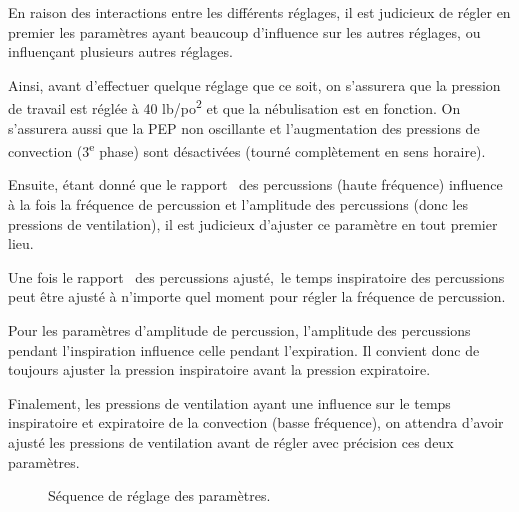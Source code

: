 En raison des interactions entre les différents réglages, il est
judicieux de régler en premier les paramètres ayant beaucoup
d'influence sur les autres réglages, ou influençant plusieurs autres
réglages.

Ainsi, avant d'effectuer quelque réglage que ce soit, on s'assurera
que la pression de travail est réglée à 40 lb/po\textsuperscript{2} et
que la nébulisation est en fonction. On s'assurera aussi que la PEP
non oscillante et l'augmentation des pressions de convection
(3\textsuperscript{e} phase) sont désactivées (tourné complètement en
sens horaire).

Ensuite, étant donné que le rapport \ie\ des percussions (haute
fréquence) influence à la fois la fréquence de percussion et
l'amplitude des percussions (donc les pressions de ventilation), il
est judicieux d'ajuster ce paramètre en tout premier lieu.

Une fois le rapport \ie\ des percussions ajusté,~le temps inspiratoire
des percussions peut être ajusté à n'importe quel moment pour régler
la fréquence de percussion.

Pour les paramètres d'amplitude de percussion, l'amplitude des
percussions pendant l'inspiration influence celle pendant
l'expiration.  Il convient donc de toujours ajuster la pression
inspiratoire avant la pression expiratoire.

Finalement, les pressions de ventilation ayant une influence sur le
temps inspiratoire et expiratoire de la convection (basse fréquence),
on attendra d'avoir ajusté les pressions de ventilation avant de
régler avec précision ces deux paramètres.

\begin{figure}
	\begin{wide}
		\tikzset{external/remake next}
		\centering
		 
		\caption{Séquence de réglage des paramètres.}
	\end{wide}
\end{figure}

\tikzexternaldisable

\tikzexternalenable
\restoregeometry
